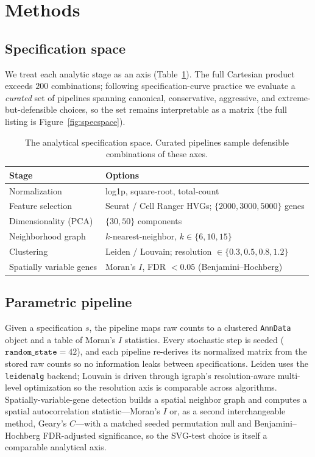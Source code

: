 \section{Methods}

\subsection{Specification space}
\label{sec:specspace}
We treat each analytic stage as an axis (Table~\ref{tab:space}). The full Cartesian product
exceeds $200$ combinations; following specification-curve practice we evaluate a
\emph{curated} set of \Nspecs{} pipelines spanning canonical, conservative, aggressive, and
extreme-but-defensible choices, so the set remains interpretable as a matrix (the full
listing is Figure~\ref{fig:specspace}).

\begin{table}[t]
  \centering
  \caption{The analytical specification space. Curated pipelines sample defensible
  combinations of these axes.}
  \label{tab:space}
  \small
  \begin{tabular}{ll}
    \toprule
    Stage & Options \\
    \midrule
    Normalization & log1p, square-root, total-count \\
    Feature selection & Seurat / Cell Ranger HVGs; $\{2000, 3000, 5000\}$ genes \\
    Dimensionality (PCA) & $\{30, 50\}$ components \\
    Neighborhood graph & $k$-nearest-neighbor, $k \in \{6, 10, 15\}$ \\
    Clustering & Leiden / Louvain; resolution $\in \{0.3, 0.5, 0.8, 1.2\}$ \\
    Spatially variable genes & Moran's $I$, FDR $< 0.05$ (Benjamini--Hochberg) \\
    \bottomrule
  \end{tabular}
\end{table}

\subsection{Parametric pipeline}
\label{sec:pipeline}
Given a specification $s$, the pipeline maps raw counts to a clustered {\tt AnnData}
\citep{virshup2023anndata} object and a table of Moran's $I$ statistics. Every stochastic
step is seeded ($\texttt{random\_state}=42$), and each pipeline re-derives its normalized
matrix from the stored raw counts so no information leaks between specifications. Leiden uses
the \texttt{leidenalg} backend; Louvain is driven through igraph's resolution-aware
multi-level optimization so the resolution axis is comparable across algorithms.
Spatially-variable-gene detection builds a spatial neighbor graph and computes a spatial
autocorrelation statistic---Moran's $I$ or, as a second interchangeable method, Geary's
$C$---with a matched seeded permutation null and Benjamini--Hochberg FDR-adjusted
significance, so the SVG-test choice is itself a comparable analytical axis.

